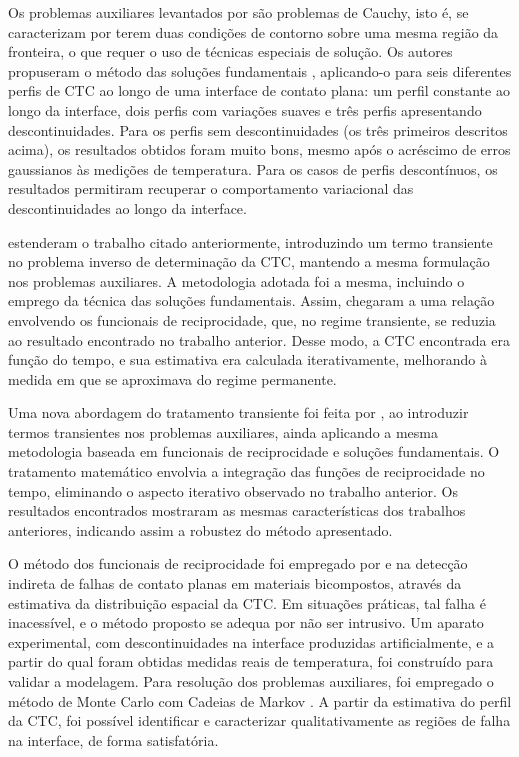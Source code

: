 Os problemas auxiliares levantados por \cite{reciproc_3} são problemas de Cauchy, isto é, se caracterizam por terem duas condições de contorno sobre uma
mesma região da fronteira, o que requer o uso de técnicas especiais de solução. Os autores propuseram o método das soluções fundamentais \citep{artigo_marin}, aplicando-o
para seis diferentes perfis de CTC ao longo de uma interface de contato plana: um perfil constante ao longo da interface, dois perfis com variações suaves e três perfis apresentando descontinuidades. Para os
perfis sem descontinuidades (os três primeiros descritos acima), os resultados obtidos foram muito bons, mesmo após o acréscimo de erros gaussianos às medições
de temperatura. Para os casos de perfis descontínuos, os resultados permitiram recuperar o comportamento variacional das descontinuidades ao longo da interface.

\cite{artigo_colaco_2} estenderam o trabalho citado anteriormente, introduzindo um termo transiente no problema inverso de determinação da CTC, mantendo a mesma formulação
nos problemas auxiliares. A
metodologia adotada foi a mesma, incluindo o emprego da técnica das soluções fundamentais. Assim, chegaram a uma relação envolvendo os funcionais de reciprocidade,
que, no regime transiente, se reduzia ao resultado encontrado no trabalho anterior. Desse modo, a CTC encontrada era função do tempo, e sua estimativa era calculada 
iterativamente, melhorando à medida em que se aproximava do regime permanente.

Uma nova abordagem do tratamento transiente foi feita por \cite{artigo_colaco_4},
ao introduzir termos transientes nos problemas auxiliares, ainda aplicando a mesma metodologia baseada em funcionais de reciprocidade e soluções fundamentais. O tratamento
matemático envolvia a integração das funções de reciprocidade no tempo, eliminando o aspecto iterativo observado no trabalho anterior. Os resultados encontrados mostraram
as mesmas características dos trabalhos anteriores, indicando assim a robustez do método apresentado.

O método dos funcionais de reciprocidade foi empregado por \cite{tese_abreu} e \cite{artigo_abreu_3} na detecção indireta de falhas de contato planas em materiais bicompostos, através da estimativa da distribuição espacial da CTC.
Em situações práticas, tal falha é inacessível, e o método proposto se adequa por não ser intrusivo. Um aparato experimental, com descontinuidades na interface produzidas artificialmente, e a partir
do qual foram obtidas medidas reais de temperatura, foi construído para validar a modelagem. Para resolução dos problemas auxiliares, foi empregado o método 
de Monte Carlo com Cadeias de Markov \citep{artigo_mcmc}. A partir da estimativa do perfil da CTC, foi possível identificar e caracterizar qualitativamente as regiões de falha na interface,
de forma satisfatória.

